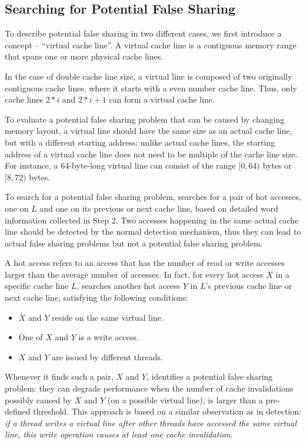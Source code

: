 \subsection{Searching for Potential False Sharing}
\label{sec:evaluatingfs}
To describe potential false sharing in two different cases, we first introduce a concept -- ``virtual cache line''.  A virtual cache line is a contiguous memory range that spans one or more physical cache lines.  

In the case of double cache line size, a virtual line is composed of two originally contiguous cache lines, where it starts with a even number cache line.  Thus, only cache lines $2*i$ and $2*i+1$ can form a virtual cache line.  

To evaluate a potential false sharing problem that can be caused by changing memory layout, a virtual line should have the same size as an actual cache line, but with a different starting address: unlike actual cache lines, the
starting address of a virtual cache line does not need to be multiple of the cache line size. For instance, a 64-byte-long virtual line can consist of the range $[0,64)$ bytes or $[8,72)$ bytes.

To search for a potential false sharing problem, 
\Predator{} searches for a pair of hot accesses, one on $L$ and one on its previous or next cache line, based on detailed word information collected in Step 2. Two accesses happening in the same actual cache line should be detected by the normal detection mechanism, thus they can lead to actual false sharing problems but not a potential false sharing problem. 

A hot access refers to an access that has the number of read or write accesses larger than the average number of accesses. In fact, for every hot access $X$ in a specific cache line $L$, \Predator{} searches another
hot access $Y$ in $L$'s previous cache line or next cache line, satisfying the following conditions: 

\begin{itemize}
\item
$X$ and $Y$ reside on the same virtual line. 

\item
One of $X$ and $Y$ is a write access.

\item 
$X$ and $Y$ are issued by different threads.

\end{itemize}

Whenever it finds such a pair, $X$ and $Y$, 
\Predator{} identifies a potential false sharing problem: they can degrade performance when the number of cache invalidations possibly caused by $X$ and $Y$ (on a possible virtual line), is larger than a pre-defined threshold. This approach is based on a similar observation as in detection: \emph{if a thread writes a virtual line after other threads have accessed the same virtual line, this write operation causes at least one cache invalidation}. 

